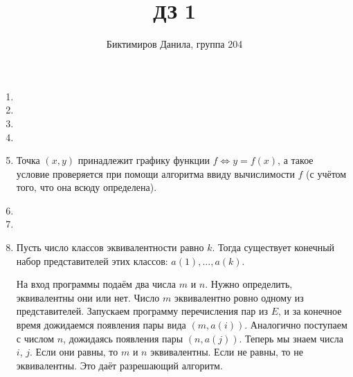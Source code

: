 \documentclass[11pt]{article}
\begin{document}
	
	\author{Биктимиров Данила, группа 204}
	\title{ДЗ 1}
	\date{}
	\maketitle
	
	\medskip
	
	\begin{enumerate}
		
		\item 
		
		
		\item
		
		\item 
		
		
		\item
		
		\item Точка $(x,y)$ принадлежит графику функции $f \Leftrightarrow y=f(x)$, а такое условие проверяется при помощи алгоритма ввиду вычислимости $f$ (с учётом того, что она всюду определена).
		
		
		\item
		
		\item 
		
		
		\item Пусть число классов эквивалентности равно $k$. Тогда существует конечный набор представителей этих классов: $a(1), ... , a(k)$.
		
		На вход программы подаём два числа $m$ и $n$. Нужно определить, эквивалентны они или нет. Число $m$ эквивалентно ровно одному из представителей. Запускаем программу перечисления пар из $E$, и за конечное время дожидаемся появления пары вида $(m,a(i))$. Аналогично поступаем с числом $n$, дожидаясь появления пары $(n,a(j))$. Теперь мы знаем числа $i$, $j$. Если они равны, то $m$ и $n$ эквивалентны. Если не равны, то не эквивалентны. Это даёт разрешающий алгоритм.
		
		
		
	\end{enumerate}
\end{document}
